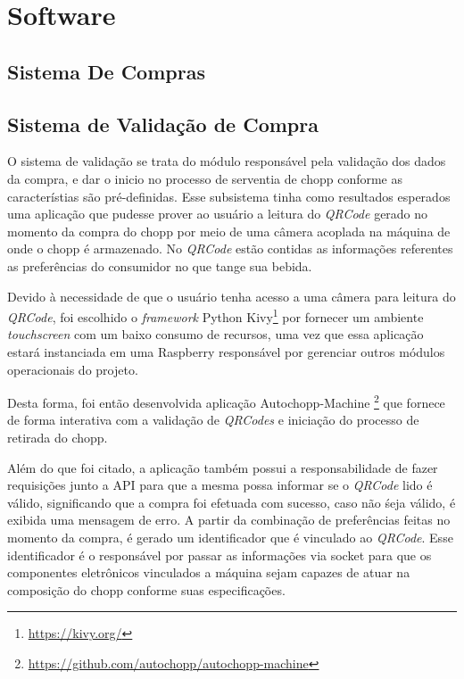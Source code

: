 \chapter[Software]{Software}
    
    \section[Sistema De Compras]{Sistema De Compras}
    
    \section[Sistema de Validação de Compra]{Sistema de Validação de Compra}
        
        O sistema de validação se trata do módulo responsável pela validação dos dados da compra,
        e dar o inicio no processo de serventia de chopp conforme as característias são pré-definidas.
        Esse subsistema tinha como resultados esperados uma aplicação que pudesse prover ao usuário
        a leitura do \textit{QRCode} gerado no momento da compra do chopp por meio de uma câmera 
        acoplada na máquina de onde o chopp é armazenado. No \textit{QRCode} estão contidas as informações
        referentes as preferências do consumidor no que tange sua bebida.
        
        Devido à necessidade de que o usuário tenha acesso a uma câmera para leitura do \textit{QRCode},
        foi escolhido o \textit{framework} Python Kivy\footnote{\url{https://kivy.org/}} por fornecer um ambiente
        \textit{touchscreen} com um baixo consumo de recursos, uma vez que essa aplicação estará 
        instanciada em uma Raspberry responsável por gerenciar outros módulos operacionais do projeto.

        Desta forma, foi então desenvolvida aplicação Autochopp-Machine \footnote{\url{https://github.com/autochopp/autochopp-machine}} que fornece de forma interativa 
        com a validação de \textit{QRCodes} e iniciação do processo de retirada do chopp. 

        Além do que foi citado, a aplicação também possui a responsabilidade de fazer requisições junto a API
        para que a mesma possa informar se o \textit{QRCode} lido é válido, significando que a compra foi 
        efetuada com sucesso, caso não śeja válido, é exibida uma mensagem de erro. A partir da combinação
        de preferências feitas no momento da compra, é gerado um identificador que é vinculado ao 
        \textit{QRCode}. Esse identificador é o responsável por passar as informações via socket para que
        os componentes eletrônicos vinculados a máquina sejam capazes de atuar na composição do chopp conforme
        suas especificações.

